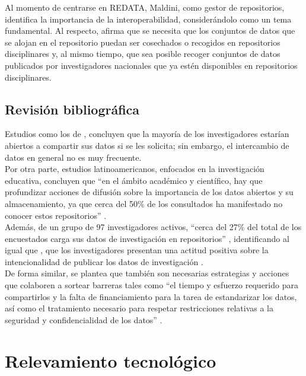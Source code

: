 \documentclass{article}
\begin{document}
Al momento de centrarse en REDATA, Maldini, como gestor de repositorios, identifica la importancia de la interoperabilidad, considerándolo como un tema fundamental. Al respecto, afirma que se necesita que los conjuntos de datos que se alojan en el repositorio puedan ser cosechados o recogidos en repositorios disciplinares y, al mismo tiempo, que sea posible recoger conjuntos de datos publicados por investigadores nacionales que ya estén disponibles en repositorios disciplinares.\\

\subsection{Revisión bibliográfica}

Estudios como los de \cite{barczak2022}, concluyen que la mayoría de los investigadores estarían abiertos a compartir sus datos si se les solicita; sin embargo, el intercambio de datos en general no es muy frecuente.\\

Por otra parte, estudios latinoamericanos, enfocados en la investigación educativa, concluyen que “en el ámbito académico y científico, hay que profundizar acciones de difusión sobre la importancia de los datos abiertos y su almacenamiento, ya que cerca del 50\% de los consultados ha manifestado no conocer estos repositorios” \cite[p.~6]{casali2022}.\\

Además, de un grupo de 97 investigadores activos, “cerca del 27\% del total de los encuestados carga sus datos de investigación en repositorios” \cite[p.~6]{casali2022}, identificando al igual que \cite{barczak2022}, que los investigadores presentan una actitud positiva sobre la intencionalidad de publicar los datos de investigación \cite{casali2022}.\\

De forma similar, se plantea que también son necesarias estrategias y acciones que colaboren a sortear barreras tales como “el tiempo y esfuerzo requerido para compartirlos y la falta de financiamiento para la tarea de estandarizar los datos, así como el tratamiento necesario para respetar restricciones relativas a la seguridad y confidencialidad de los datos” \cite[p.~6]{casali2022}.\\


\section{Relevamiento tecnológico}
\end{document}
